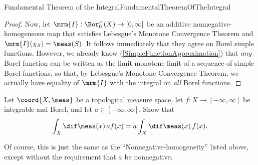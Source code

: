 \begin{thm}{Fundamental Theorem of the Integral}{FundamentalTheoremOfTheIntegral}
\begin{proof}
Now, let $\mrm{I}:\Bor _0^+(X)\rightarrow [0,\infty ]$ be an additive nonnegative-homogeneous map that satisfies Lebesgue's Monotone Convergence Theorem and $\mrm{I}(\chi _S)=\meas (S)$.  It follows immediately that they agree on Borel simple functions.  However, we already know (\cref{SimpleFunctionApproximation}) that \emph{any} Borel function can be written as the limit monotone limit of a sequence of simple Borel functions, so that, by Lebesgue's Monotone Convergence Theorem, we actually have equality of $\mrm{I}$ with the integral on \emph{all} Borel functions.
\end{proof}
\end{thm}
\begin{exr}{}{}
Let $\coord{X,\meas}$ be a topological measure space, let $f\colon X\rightarrow [-\infty ,\infty]$ be integrable and Borel, and let $a\in [-\infty ,\infty ]$.  Show that
\begin{equation}
\int _X\dif \meas (x)\, af(x)=a\int _X\dif \meas (x)\, f(x).
\end{equation}
\begin{rmk}
Of course, this is just the same as the ``Nonnegative-homogeneity'' listed above, except without the requirement that $a$ be nonnegative.
\end{rmk}
\end{exr}


